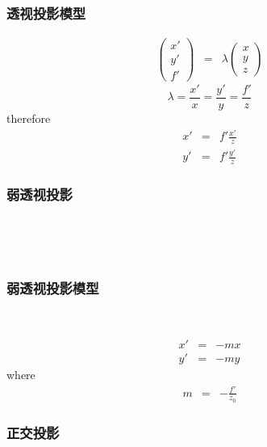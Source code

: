 \documentclass{beamer}
\newcommand{\nospace}{}
\begin{document}
{{{{\begin{frame}
  \ 
\end{frame}}{\begin{frame}
  \frametitle{透视投影模型}
  
  
  \begin{eqnarray*}
    \left(\begin{array}{c}
      x'\\
      y'\\
      f'
    \end{array}\right) & = & \lambda \left(\begin{array}{c}
      x\\
      y\\
      z
    \end{array}\right)
  \end{eqnarray*}
  \[ \lambda = \frac{x'}{x} = \frac{y'}{y} = \frac{f'}{z} \]
  therefore
  \begin{eqnarray*}
    x' & = & f' \frac{x'}{z}\\
    y' & = & f' \frac{y'}{z}
  \end{eqnarray*}
  
\end{frame}}{\begin{frame}
  \frametitle{弱透视投影}
  
  \
  
  \
  
  \qquad{}
\end{frame}}{\begin{frame}
  \frametitle{弱透视投影模型}
  
  \
  
  
  \begin{eqnarray*}
    x' & = & - m \nospace x\\
    y' & = & - m \nospace y
  \end{eqnarray*}
  where
  \begin{eqnarray*}
    m & = & - \frac{f'}{z_0}
  \end{eqnarray*}
\end{frame}}{\begin{frame}
  \frametitle{正交投影}
  

\end{frame}}}}}
\end{document}
